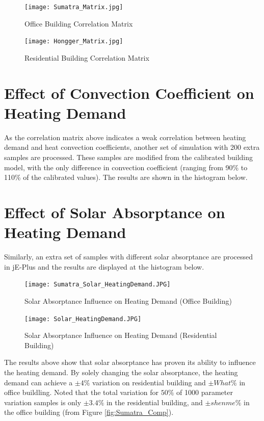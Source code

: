 		
	    \begin{figure}[H]
		\centering
		\texttt{[image: Sumatra\_Matrix.jpg]}
		\caption{Office Building Correlation Matrix}
		\label{fig:Sumatra_Matrix}
		\end{figure}
			
	    \begin{figure}[H]
		\centering
		\texttt{[image: Hongger\_Matrix.jpg]}
		\caption{Residential Building Correlation Matrix}
		\label{fig:Hongg_Matrix}
		\end{figure}


	\section{Effect of Convection Coefficient on Heating Demand}
        	As the correlation matrix above indicates a weak correlation between heating demand and heat convection coefficients, another set of simulation with 200 extra samples are processed. These samples are modified from the calibrated building model, with the only difference in convection coefficient (ranging from 90\% to 110\% of the calibrated values). The results are shown in the histogram below.\\
        	
        	
    \section{Effect of Solar Absorptance on Heating Demand}
			Similarly, an extra set of samples with different solar absorptance are processed in jE-Plus and the results are displayed at the histogram below.\\
			
    	    \begin{figure}[H]
    		\centering
    		\texttt{[image: Sumatra\_Solar\_HeatingDemand.JPG]}
    		\caption{Solar Absorptance Influence on Heating Demand (Office Building)}
    		\label{fig:Sumatra_solar}
    		\end{figure}

    	    \begin{figure}[H]
    		\centering
    		\texttt{[image: Solar\_HeatingDemand.JPG]}
    		\caption{Solar Absorptance Influence on Heating Demand (Residential Building)}
    		\label{fig:Hongg_solar}
    		\end{figure}			
        
        The results above show that solar absorptance has proven its ability to influence the heating demand. By solely changing the solar absorptance, the heating demand can achieve a $\pm 4\%$ variation on residential building and $\pm What \%$ in office buildling. Noted that the total variation for $50\%$ of 1000 parameter variation samples is only $\pm 3.4\%$ in the residential building, and $\pm shenme \%$ in the office building (from Figure \ref{fig:Sumatra_Comp}).
        
